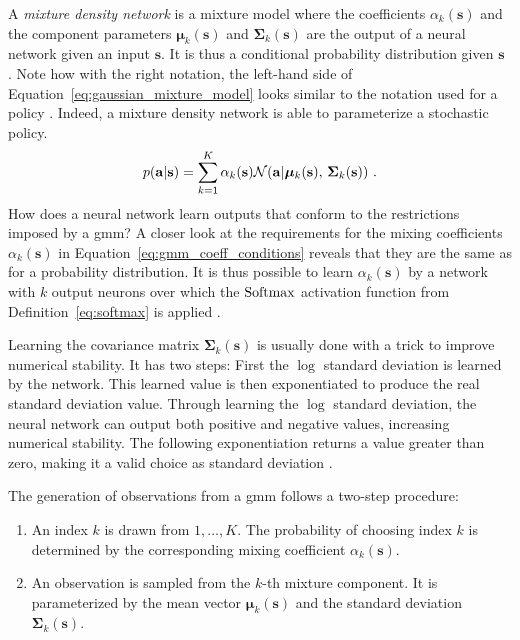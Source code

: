 A \emph{mixture density network} is a mixture model where the coefficients $\alpha_k (\mathbf s)$ and the component parameters $\bm \mu_k (\mathbf s)$ and $\bm \Sigma_k (\mathbf s)$ are the output of a neural network given an input $\mathbf s$. It is thus a conditional probability distribution given $\mathbf s$ \cite{bishopMixtureDensityNetworks1994}. Note how with the right notation, the left-hand side of Equation~\ref{eq:gaussian_mixture_model} looks similar to the notation used for a policy \p. Indeed, a mixture density network is able to parameterize a stochastic policy.
\begin{gather}\label{eq:gaussian_mixture_model}
    p(\mathbf a | \mathbf s) = \sum_{k=1}^K \alpha_k (\mathbf s) \mathcal{N}(\mathbf a | \bm \mu_k (\mathbf s), \, \bm \Sigma_k (\mathbf s))~.
\end{gather}
How does a neural network learn outputs that conform to the restrictions imposed by a \gls{gmm}? A closer look at the requirements for the mixing coefficients $\alpha_k (\mathbf s)$ in Equation~\ref{eq:gmm_coeff_conditions} reveals that they are the same as for a probability distribution. It is thus possible to learn $\alpha_k (\mathbf s)$ by a network with $k$ output neurons over which the $\operatorname{Softmax}$ activation function from Definition~\ref{eq:softmax} is applied \cite{bishopPatternRecognitionMachine2006}.

Learning the covariance matrix $\bm \Sigma_k (\mathbf s)$ is usually done with a trick to improve numerical stability. It has two steps: First the $\log$ standard deviation is learned by the network. This learned value is then exponentiated to produce the real standard deviation value. Through learning the $\log$ standard deviation, the neural network can output both positive and negative values, increasing numerical stability. The following exponentiation returns a value greater than zero, making it a valid choice as standard deviation \cite{schulmanTrustRegionPolicy2017}.

The generation of observations from a \gls{gmm} follows a two-step procedure:
\begin{enumerate}
    \item An index $k$ is drawn from $1, \ldots, K$. The probability of choosing index $k$ is determined by the corresponding mixing coefficient $\alpha_k (\mathbf s)$.
    \item An observation is sampled from the $k$-th mixture component. It is parameterized by the mean vector $\bm \mu_k (\mathbf s)$ and the standard deviation $\bm \Sigma_k (\mathbf s)$.
\end{enumerate}